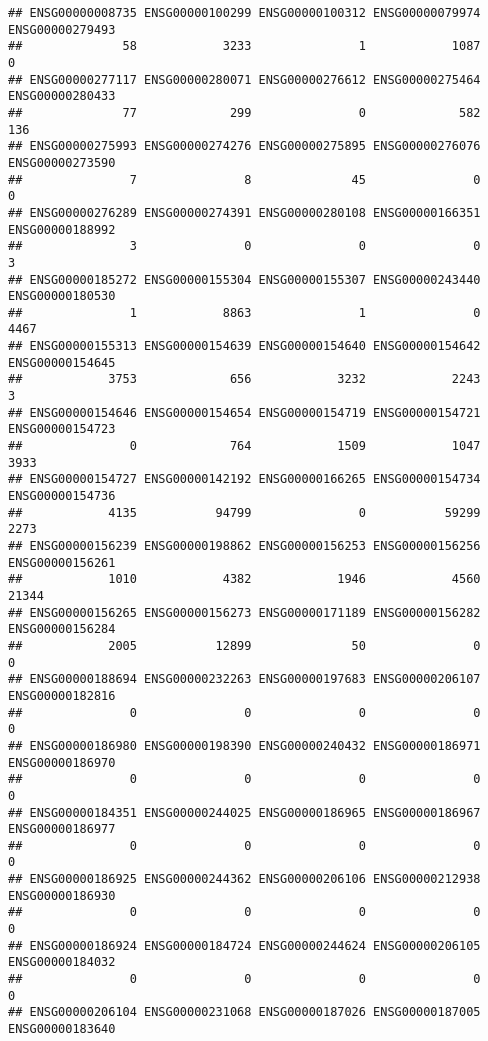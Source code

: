 \documentclass[
]{article}
\begin{document}
\begin{verbatim}
## ENSG00000008735 ENSG00000100299 ENSG00000100312 ENSG00000079974 ENSG00000279493 
##              58            3233               1            1087               0 
## ENSG00000277117 ENSG00000280071 ENSG00000276612 ENSG00000275464 ENSG00000280433 
##              77             299               0             582             136 
## ENSG00000275993 ENSG00000274276 ENSG00000275895 ENSG00000276076 ENSG00000273590 
##               7               8              45               0               0 
## ENSG00000276289 ENSG00000274391 ENSG00000280108 ENSG00000166351 ENSG00000188992 
##               3               0               0               0               3 
## ENSG00000185272 ENSG00000155304 ENSG00000155307 ENSG00000243440 ENSG00000180530 
##               1            8863               1               0            4467 
## ENSG00000155313 ENSG00000154639 ENSG00000154640 ENSG00000154642 ENSG00000154645 
##            3753             656            3232            2243               3 
## ENSG00000154646 ENSG00000154654 ENSG00000154719 ENSG00000154721 ENSG00000154723 
##               0             764            1509            1047            3933 
## ENSG00000154727 ENSG00000142192 ENSG00000166265 ENSG00000154734 ENSG00000154736 
##            4135           94799               0           59299            2273 
## ENSG00000156239 ENSG00000198862 ENSG00000156253 ENSG00000156256 ENSG00000156261 
##            1010            4382            1946            4560           21344 
## ENSG00000156265 ENSG00000156273 ENSG00000171189 ENSG00000156282 ENSG00000156284 
##            2005           12899              50               0               0 
## ENSG00000188694 ENSG00000232263 ENSG00000197683 ENSG00000206107 ENSG00000182816 
##               0               0               0               0               0 
## ENSG00000186980 ENSG00000198390 ENSG00000240432 ENSG00000186971 ENSG00000186970 
##               0               0               0               0               0 
## ENSG00000184351 ENSG00000244025 ENSG00000186965 ENSG00000186967 ENSG00000186977 
##               0               0               0               0               0 
## ENSG00000186925 ENSG00000244362 ENSG00000206106 ENSG00000212938 ENSG00000186930 
##               0               0               0               0               0 
## ENSG00000186924 ENSG00000184724 ENSG00000244624 ENSG00000206105 ENSG00000184032 
##               0               0               0               0               0 
## ENSG00000206104 ENSG00000231068 ENSG00000187026 ENSG00000187005 ENSG00000183640 

\end{verbatim}
\end{document}
